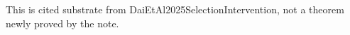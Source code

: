 This is cited substrate from DaiEtAl2025SelectionIntervention, not a theorem newly proved by the note.